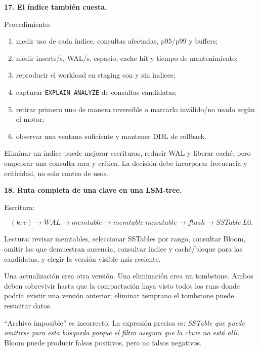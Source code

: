 \documentclass[variant=guiaresuelta,cover=institutional,mode=screen]{ua-engineering-v6-article}
\begin{document}
\begin{uaexercise}
\textbf{17. El índice también cuesta.}
\end{uaexercise}
\begin{uaanswer}
Procedimiento:

\begin{enumerate}
\item medir uso de cada índice, consultas afectadas, p95/p99 y buffers;
\item medir inserts/s, WAL/s, espacio, cache hit y tiempo de mantenimiento;
\item reproducir el workload en staging con y sin índices;
\item capturar \texttt{EXPLAIN ANALYZE} de consultas candidatas;
\item retirar primero uno de manera reversible o marcarlo inválido/no usado según el motor;
\item observar una ventana suficiente y mantener DDL de rollback.
\end{enumerate}

Eliminar un índice puede mejorar escrituras, reducir WAL y liberar caché, pero empeorar una consulta rara y crítica. La decisión debe incorporar frecuencia y criticidad, no solo conteo de usos.
\end{uaanswer}

\begin{uaexercise}
\textbf{18. Ruta completa de una clave en una LSM-tree.}
\end{uaexercise}
\begin{uaanswer}
Escritura:

\[
(k,v) \rightarrow WAL \rightarrow memtable \rightarrow memtable\ inmutable
\rightarrow flush \rightarrow SSTable\ L0.
\]

Lectura: revisar memtables, seleccionar SSTables por rango, consultar Bloom, omitir las que demuestran ausencia, consultar índice y caché/bloque para las candidatas, y elegir la versión visible más reciente.

Una actualización crea otra versión. Una eliminación crea un tombstone. Ambos deben sobrevivir hasta que la compactación haya visto todos los runs donde podría existir una versión anterior; eliminar temprano el tombstone puede resucitar datos.

``Archivo imposible'' es incorrecto. La expresión precisa es: \emph{SSTable que puede omitirse para esta búsqueda porque el filtro asegura que la clave no está allí}. Bloom puede producir falsos positivos, pero no falsos negativos.
\end{uaanswer}
\end{document}
